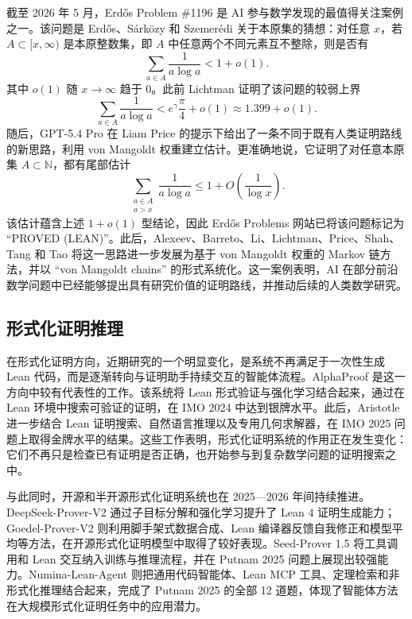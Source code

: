截至 2026 年 5 月，Erdős Problem \#1196 是 AI 参与数学发现的最值得关注案例之一。该问题是 Erdős、Sárközy 和 Szemerédi 关于本原集的猜想：对任意 \(x\)，若 \(A\subset[x,\infty)\) 是本原整数集，即 \(A\) 中任意两个不同元素互不整除，则是否有
\[
\sum_{a\in A}\frac{1}{a\log a}<1+o(1).
\]
其中 \(o(1)\) 随 \(x\to\infty\) 趋于 \(0\)\cite{Erdos1196,Tao2026Primitive}。此前 Lichtman 证明了该问题的较弱上界\cite{Lichtman2023Primitive}
\[
\sum_{a\in A}\frac{1}{a\log a}<e^\gamma\frac{\pi}{4}+o(1)\approx 1.399+o(1).
\]
随后，GPT-5.4 Pro 在 Liam Price 的提示下给出了一条不同于既有人类证明路线的新思路，利用 von Mangoldt 权重建立估计。更准确地说，它证明了对任意本原集 \(A\subset\mathbb{N}\)，都有尾部估计
\[
\sum_{\substack{a\in A\\a>x}}\frac{1}{a\log a}
\le 1+O\left(\frac{1}{\log x}\right).
\]
该估计蕴含上述 \(1+o(1)\) 型结论，因此 Erdős Problems 网站已将该问题标记为 “PROVED (LEAN)”\cite{Erdos1196}。此后，Alexeev、Barreto、Li、Lichtman、Price、Shah、Tang 和 Tao 将这一思路进一步发展为基于 von Mangoldt 权重的 Markov 链方法，并以 “von Mangoldt chains” 的形式系统化\cite{Alexeev2026Primitive,Tao2026Primitive}。这一案例表明，AI 在部分前沿数学问题中已经能够提出具有研究价值的证明路线，并推动后续的人类数学研究。

\subsection{形式化证明推理}

在形式化证明方向，近期研究的一个明显变化，是系统不再满足于一次性生成 Lean 代码，而是逐渐转向与证明助手持续交互的智能体流程。AlphaProof 是这一方向中较有代表性的工作。该系统将 Lean 形式验证与强化学习结合起来，通过在 Lean 环境中搜索可验证的证明，在 IMO 2024 中达到银牌水平\cite{Hubert2025AlphaProof}。此后，Aristotle 进一步结合 Lean 证明搜索、自然语言推理以及专用几何求解器，在 IMO 2025 问题上取得金牌水平的结果\cite{Achim2025Aristotle}。这些工作表明，形式化证明系统的作用正在发生变化：它们不再只是检查已有证明是否正确，也开始参与到复杂数学问题的证明搜索之中。

与此同时，开源和半开源形式化证明系统也在 2025—2026 年间持续推进。DeepSeek-Prover-V2 通过子目标分解和强化学习提升了 Lean 4 证明生成能力\cite{Ren2025DeepSeekProverV2}；Goedel-Prover-V2 则利用脚手架式数据合成、Lean 编译器反馈自我修正和模型平均等方法，在开源形式化证明模型中取得了较好表现\cite{Lin2025GoedelProverV2}。Seed-Prover 1.5 将工具调用和 Lean 交互纳入训练与推理流程，并在 Putnam 2025 问题上展现出较强能力\cite{Chen2025SeedProver}。Numina-Lean-Agent 则把通用代码智能体、Lean MCP 工具、定理检索和非形式化推理结合起来，完成了 Putnam 2025 的全部 12 道题，体现了智能体方法在大规模形式化证明任务中的应用潜力\cite{Liu2026NuminaLeanAgent}。


